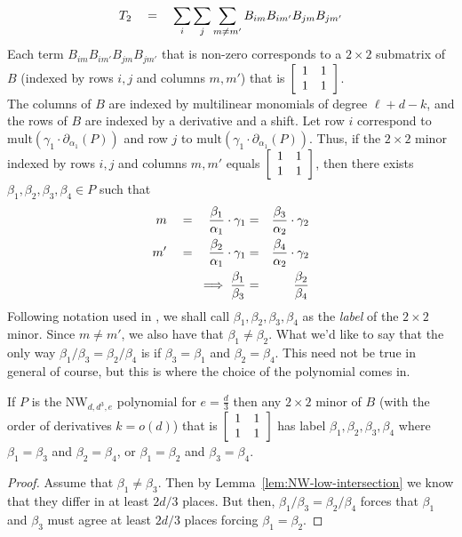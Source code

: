 \documentclass[12pt]{report}
\newcommand{\NW}{\mathrm{NW}}
\begin{document}
\[
T_2 \quad = \quad \sum_i \sum_j \sum_{m\neq m'} B_{im}B_{im'}B_{jm}B_{jm'}
\]
Each term $B_{im}B_{im'}B_{jm}B_{jm'}$ that is non-zero corresponds to a $2\times 2$ submatrix of $B$ (indexed by rows $i,j$ and columns $m,m'$) that is $\left[\begin{array}{cc} 1 & 1\\ 1&1
  \end{array}\right]$. \\

The columns of $B$ are indexed by multilinear monomials of degree $\ell + d - k$, and the rows of $B$ are indexed by a derivative and a shift. Let row $i$ correspond to $\mathrm{mult}(\gamma_1 \cdot \partial_{\alpha_1}(P))$ and row $j$ to $\mathrm{mult}(\gamma_1 \cdot \partial_{\alpha_1}(P))$. Thus, if the $2\times 2$ minor indexed by rows $i,j$ and columns $m,m'$ equals $\left[\begin{array}{cc} 1 & 1\\ 1&1 \end{array}\right]$, then there exists $\beta_1, \beta_2,\beta_3,\beta_4 \in P$ such that
\begin{eqnarray*}
m \quad = \quad \frac{\beta_1}{\alpha_1}\cdot \gamma_1 & = & \frac{\beta_3}{\alpha_2} \cdot  \gamma_2\\
m' \quad = \quad \frac{\beta_2}{\alpha_1}\cdot \gamma_1 & = & \frac{\beta_4}{\alpha_2}\cdot \gamma_2\\
\implies \frac{\beta_1}{\beta_3} & = & \frac{\beta_2}{\beta_4}
\end{eqnarray*}
Following notation used in \cite{KLSS}, we shall call $\beta_1,\beta_2,\beta_3,\beta_4$ as the \emph{label} of the $2\times 2$ minor. 
Since $m\neq m'$, we also have that $\beta_1 \neq \beta_2$. What we'd like to say that the only way $\beta_1/\beta_3 = \beta_2/\beta_4$ is if $\beta_3 = \beta_1$ and $\beta_2 = \beta_4$. This need not be true in general of course, but this is where the choice of the polynomial comes in. 

\begin{claim}
If $P$ is the $\NW_{d,d^3, e}$ polynomial for $e = \frac{d}{3}$ then any $2\times 2$ minor of $B$ (with the order of derivatives $k = o(d)$) that is $\left[\begin{array}{cc} 1&1\\1&1\end{array}\right]$ has label $\beta_1,\beta_2,\beta_3,\beta_4$ where $\beta_1 = \beta_3$ and $\beta_2 = \beta_4$, or $\beta_1 = \beta_2$ and $\beta_3 = \beta_4$. 
\end{claim}
\begin{proof}
Assume that $\beta_1 \neq \beta_3$. Then by Lemma~\ref{lem:NW-low-intersection} we know that they differ in at least $2d/3$ places. But then, $\beta_1/\beta_3 = \beta_2/\beta_4$ forces that $\beta_1$ and $\beta_3$ must agree at least $2d/3$ places forcing $\beta_1 = \beta_2$. 
\end{proof}
\end{document}
